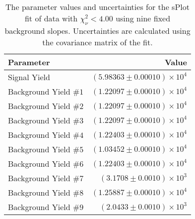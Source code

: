 
\begin{table}[ht]
    \begin{center}
        \begin{tabular}{lr}\toprule
            Parameter & Value \\\midrule
            Signal Yield & $(5.98363 \pm 0.00010) \times 10^{4}$ \\
            Background Yield $\#1$ & $(1.22097 \pm 0.00010) \times 10^{4}$ \\
            Background Yield $\#2$ & $(1.22097 \pm 0.00010) \times 10^{4}$ \\
            Background Yield $\#3$ & $(1.22097 \pm 0.00010) \times 10^{4}$ \\
            Background Yield $\#4$ & $(1.22403 \pm 0.00010) \times 10^{4}$ \\
            Background Yield $\#5$ & $(1.03452 \pm 0.00010) \times 10^{4}$ \\
            Background Yield $\#6$ & $(1.22403 \pm 0.00010) \times 10^{4}$ \\
            Background Yield $\#7$ & $(3.1708 \pm 0.0010) \times 10^{3}$ \\
            Background Yield $\#8$ & $(1.25887 \pm 0.00010) \times 10^{4}$ \\
            Background Yield $\#9$ & $(2.0433 \pm 0.0010) \times 10^{3}$ \\\bottomrule
        \end{tabular}
        \caption{The parameter values and uncertainties for the sPlot fit of data with $\chi^2_\nu < 4.00$ using nine fixed background slopes. Uncertainties are calculated using the covariance matrix of the fit.}\label{tab:splot-fit-results-chisqdof-4.00-fixed-9}
    \end{center}
\end{table}
